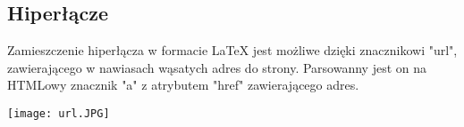 \subsection{Hiperłącze}

Zamieszczenie hiperłącza w formacie LaTeX jest możliwe dzięki znacznikowi "url", zawierającego w nawiasach wąsatych adres do strony.
Parsowanny jest on na HTMLowy znacznik "a" z atrybutem "href" zawierającego adres.

\texttt{[image: url.JPG]}